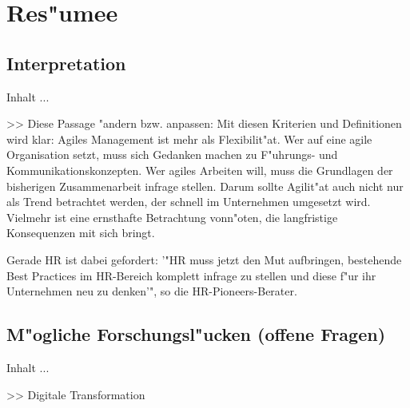 
\chapter{Res"umee}
\minitoc 
\vspace{1 cm} 

\section{Interpretation}
Inhalt ...

>> Diese Passage "andern bzw. anpassen:
Mit diesen Kriterien und Definitionen wird klar: Agiles Management ist mehr als Flexibilit"at. Wer auf eine agile Organisation setzt, muss sich Gedanken machen zu F"uhrungs- und Kommunikationskonzepten. Wer agiles Arbeiten will, muss die Grundlagen der bisherigen Zusammenarbeit infrage stellen. Darum sollte Agilit"at auch nicht nur als Trend betrachtet werden, der schnell im Unternehmen umgesetzt wird. Vielmehr ist eine ernsthafte Betrachtung vonn"oten, die langfristige Konsequenzen mit sich bringt.

Gerade HR ist dabei gefordert: '"HR muss jetzt den Mut aufbringen, bestehende Best Practices im HR-Bereich komplett infrage zu stellen und diese f"ur ihr Unternehmen neu zu denken'", so die HR-Pioneers-Berater.


\section{M"ogliche Forschungsl"ucken (offene Fragen)}
Inhalt ...

>> Digitale Transformation



